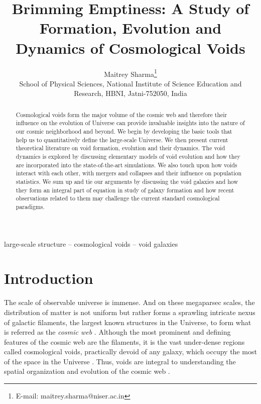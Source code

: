 \documentclass[fleqn,usenatbib]{mnras}
\title[Cosmic Voids]{Brimming Emptiness: A Study of Formation, Evolution and Dynamics of Cosmological Voids}
\author[Maitrey Sharma]{
Maitrey Sharma\thanks{E-mail: maitrey.sharma@niser.ac.in}
\\
School of Physical Sciences, National Institute of Science Education and Research, HBNI, Jatni-752050, India\\
}
\begin{document}
\label{firstpage}
\pagerange{\pageref{firstpage}--\pageref{lastpage}}
\maketitle

\begin{abstract}
Cosmological voids form the major volume of the cosmic web and therefore their influence on the evolution of Universe can provide invaluable insights into the nature of our cosmic neighborhood and beyond. We begin by developing the basic tools that help us to quantitatively define the large-scale Universe. We then present current theoretical literature on void formation, evolution and their dynamics. The void dynamics is explored by discussing elementary models of void evolution and how they are incorporated into the state-of-the-art simulations. We also touch upon how voids interact with each other, with mergers and collapses and their influence on population statistics. We sum up and tie our arguments by discussing the void galaxies and how they form an integral part of equation in study of galaxy formation and how recent observations related to them may challenge the current standard cosmological paradigms.
\end{abstract}

\begin{keywords}
large-scale structure -- cosmological voids -- void galaxies
\end{keywords}



\section{Introduction}

The scale of observable universe is immense. And on these megaparsec scales, the distribution of matter is not uniform but rather forms a sprawling intricate nexus of galactic filaments, the largest known structures in the Universe, to form what is referred as the \textit{cosmic web} \citep{bond_how_1996}. Although the most prominent and defining features of the cosmic web are the filaments, it is the vast under-dense regions called cosmological voids, practically devoid of any galaxy, which occupy the most of the space in the Universe \citep{libeskind_tracing_2018, van_de_weygaert_voids_2014}. Thus, voids are integral to understanding the spatial organization and evolution of the cosmic web \citep{icke_voids_1984, sahni_evolution_1994, sheth_hierarchy_2004, einasto_wavelet_2011, aragon-calvo_hierarchical_2013}. 
\end{document}
